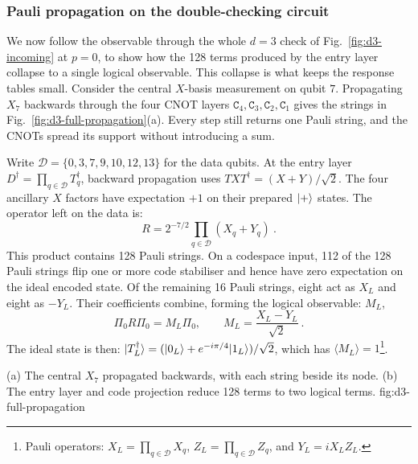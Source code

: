 \subsubsection{Pauli propagation on the double-checking circuit}

We now follow the observable through the whole $d=3$ check of Fig.~\ref{fig:d3-incoming} at $p=0$, to show how the 128 terms produced by the entry layer collapse to a single logical observable. This collapse is what keeps the response tables small. Consider the central $X$-basis measurement on qubit $7$. 
Propagating $X_7$ backwards through the four CNOT layers $\mathtt{C}_4,\mathtt{C}_3,\mathtt{C}_2,\mathtt{C}_1$ gives the strings in
Fig.~\ref{fig:d3-full-propagation}(a). Every step still returns one Pauli string, and the CNOTs spread its support without introducing a sum.

Write $\mathcal D=\{0,3,7,9,10,12,13\}$ for the data qubits.
At the entry layer $D^\dagger=\prod_{q\in\mathcal D}T_q^\dagger$,
backward propagation uses $TXT^\dagger=(X+Y)/\sqrt2$.
The four ancillary $X$ factors have expectation $+1$ on their prepared
$\lvert+\rangle$ states. The operator left on the data is:
\begin{equation}
 R=2^{-7/2}\prod_{q\in\mathcal D}(X_q+Y_q) \ .
 \label{eq:v2-central-operator}
\end{equation}
This product contains 128 Pauli strings. On a codespace input, 112 of the 128 Pauli strings flip one or more code stabiliser
and hence have zero expectation on the ideal encoded state.
Of the remaining 16 Pauli strings, eight act as $X_L$ and eight as $-Y_L$.
Their coefficients combine, forming the logical observable: $M_L$,
\begin{equation}
 \Pi_0R\Pi_0=M_L\Pi_0,\qquad M_L=\frac{X_L-Y_L}{\sqrt2} \ .
 \label{eq:v2-central-logical}
\end{equation}
The ideal state is then:
$\lvert T_L^\dagger\rangle=(\lvert0_L\rangle+e^{-i\pi/4}\lvert1_L\rangle)/\sqrt2$,
which has $\langle M_L\rangle=1$\footnote{Pauli operators: $X_L=\prod_{q\in\mathcal D}X_q$, $Z_L=\prod_{q\in\mathcal D}Z_q$,
and $Y_L=iX_LZ_L$.}.

{(a) The central $X_7$ propagated backwards, with each string
beside its node. (b) The entry layer and code projection reduce
128 terms to two logical terms.}
{fig:d3-full-propagation}

